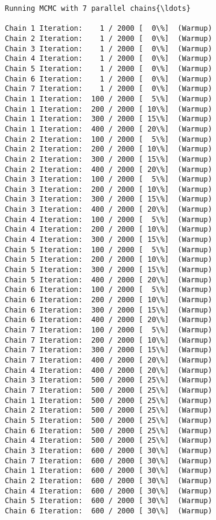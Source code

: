 \documentclass[11pt]{article}
\begin{document}
    \begin{Verbatim}[commandchars=\\\{\}]
Running MCMC with 7 parallel chains{\ldots}

Chain 1 Iteration:    1 / 2000 [  0\%]  (Warmup)
Chain 2 Iteration:    1 / 2000 [  0\%]  (Warmup)
Chain 3 Iteration:    1 / 2000 [  0\%]  (Warmup)
Chain 4 Iteration:    1 / 2000 [  0\%]  (Warmup)
Chain 5 Iteration:    1 / 2000 [  0\%]  (Warmup)
Chain 6 Iteration:    1 / 2000 [  0\%]  (Warmup)
Chain 7 Iteration:    1 / 2000 [  0\%]  (Warmup)
Chain 1 Iteration:  100 / 2000 [  5\%]  (Warmup)
Chain 1 Iteration:  200 / 2000 [ 10\%]  (Warmup)
Chain 1 Iteration:  300 / 2000 [ 15\%]  (Warmup)
Chain 1 Iteration:  400 / 2000 [ 20\%]  (Warmup)
Chain 2 Iteration:  100 / 2000 [  5\%]  (Warmup)
Chain 2 Iteration:  200 / 2000 [ 10\%]  (Warmup)
Chain 2 Iteration:  300 / 2000 [ 15\%]  (Warmup)
Chain 2 Iteration:  400 / 2000 [ 20\%]  (Warmup)
Chain 3 Iteration:  100 / 2000 [  5\%]  (Warmup)
Chain 3 Iteration:  200 / 2000 [ 10\%]  (Warmup)
Chain 3 Iteration:  300 / 2000 [ 15\%]  (Warmup)
Chain 3 Iteration:  400 / 2000 [ 20\%]  (Warmup)
Chain 4 Iteration:  100 / 2000 [  5\%]  (Warmup)
Chain 4 Iteration:  200 / 2000 [ 10\%]  (Warmup)
Chain 4 Iteration:  300 / 2000 [ 15\%]  (Warmup)
Chain 5 Iteration:  100 / 2000 [  5\%]  (Warmup)
Chain 5 Iteration:  200 / 2000 [ 10\%]  (Warmup)
Chain 5 Iteration:  300 / 2000 [ 15\%]  (Warmup)
Chain 5 Iteration:  400 / 2000 [ 20\%]  (Warmup)
Chain 6 Iteration:  100 / 2000 [  5\%]  (Warmup)
Chain 6 Iteration:  200 / 2000 [ 10\%]  (Warmup)
Chain 6 Iteration:  300 / 2000 [ 15\%]  (Warmup)
Chain 6 Iteration:  400 / 2000 [ 20\%]  (Warmup)
Chain 7 Iteration:  100 / 2000 [  5\%]  (Warmup)
Chain 7 Iteration:  200 / 2000 [ 10\%]  (Warmup)
Chain 7 Iteration:  300 / 2000 [ 15\%]  (Warmup)
Chain 7 Iteration:  400 / 2000 [ 20\%]  (Warmup)
Chain 4 Iteration:  400 / 2000 [ 20\%]  (Warmup)
Chain 3 Iteration:  500 / 2000 [ 25\%]  (Warmup)
Chain 7 Iteration:  500 / 2000 [ 25\%]  (Warmup)
Chain 1 Iteration:  500 / 2000 [ 25\%]  (Warmup)
Chain 2 Iteration:  500 / 2000 [ 25\%]  (Warmup)
Chain 5 Iteration:  500 / 2000 [ 25\%]  (Warmup)
Chain 6 Iteration:  500 / 2000 [ 25\%]  (Warmup)
Chain 4 Iteration:  500 / 2000 [ 25\%]  (Warmup)
Chain 3 Iteration:  600 / 2000 [ 30\%]  (Warmup)
Chain 7 Iteration:  600 / 2000 [ 30\%]  (Warmup)
Chain 1 Iteration:  600 / 2000 [ 30\%]  (Warmup)
Chain 2 Iteration:  600 / 2000 [ 30\%]  (Warmup)
Chain 4 Iteration:  600 / 2000 [ 30\%]  (Warmup)
Chain 5 Iteration:  600 / 2000 [ 30\%]  (Warmup)
Chain 6 Iteration:  600 / 2000 [ 30\%]  (Warmup)

\end{Verbatim}
\end{document}
